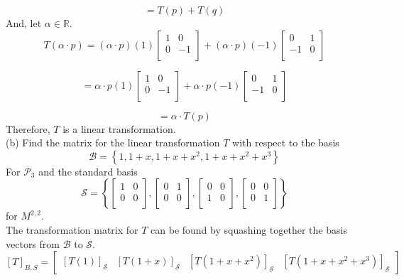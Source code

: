 \documentclass[12pt]{article}
\begin{document}
$$
=T(p)+T(q)
$$
And, let $\alpha \in \mathbb{R}$.\\
$$
T(\alpha\cdot p)=
(\alpha\cdot p)(1)
\begin{bmatrix}
	1 & 0 \\
	0 & -1 \\
\end{bmatrix}
+
(\alpha\cdot p)(-1)
\begin{bmatrix}
	0 & 1 \\
	-1 & 0 \\
\end{bmatrix}
$$

$$
=
\alpha \cdot p(1)
\begin{bmatrix}
	1 & 0 \\
	0 & -1 \\
\end{bmatrix}
+
\alpha \cdot p(-1)
\begin{bmatrix}
	0 & 1 \\
	-1 & 0 \\
\end{bmatrix}
$$

$$
=
\alpha \cdot T(p)
$$
Therefore, $T$ is a linear transformation.\\
\medskip
(b) Find the matrix for the linear transformation $T$ with respect to the basis
$$
\mathcal{B}=
\left\lbrace
1, 1+x, 1+x+x^2, 1+x+x^2+x^3
\right\rbrace
$$
For $\mathcal{P_3}$ and the standard basis
$$
\mathcal{S}=
\left\lbrace
\begin{bmatrix}
	1 & 0 \\
	0 & 0 \\
\end{bmatrix}
,
\begin{bmatrix}
	0 & 1 \\
	0 & 0 \\
\end{bmatrix}
,
\begin{bmatrix}
	0 & 0 \\
	1 & 0 \\
\end{bmatrix}
,
\begin{bmatrix}
	0 & 0 \\
	0 & 1 \\
\end{bmatrix}
\right\rbrace
$$
for $M^{2,2}$.\\
\medskip
The transformation matrix for $T$ can be found by squashing together the basis vectors from $\mathcal{B}$ to $\mathcal{S}$.
$$
\left[T\right]_{B,S}
=
\begin{bmatrix}
\left[ T(1) \right]_\mathcal{S} &
\left[ T(1+x) \right]_\mathcal{S} & 
\left[ T(1+x+x^2) \right]_\mathcal{S} &
\left[ T(1+x+x^2+x^3) \right]_\mathcal{S}
\end{bmatrix}
$$
\end{document}
